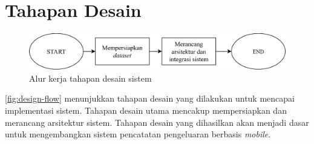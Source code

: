 \section{Tahapan Desain}
\label{sec:tahapan-desain}

\begin{figure}[htbp]
    \centering
    \includegraphics[width=1\textwidth]{images/design-flow.png}
    \caption{Alur kerja tahapan desain sistem}
    \label{fig:design-flow}
\end{figure}

\autoref{fig:design-flow} menunjukkan tahapan desain yang dilakukan untuk mencapai implementasi sistem. Tahapan desain utama mencakup mempersiapkan \dataset dan merancang arsitektur sistem. Tahapan desain yang dihasilkan akan menjadi dasar untuk mengembangkan sistem pencatatan pengeluaran berbasis \emph{mobile}.



